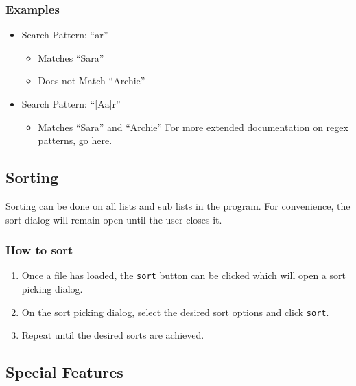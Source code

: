 \documentclass[english,floatsintext,man]{apa6}
\providecommand{\tightlist}{%
  \setlength{\itemsep}{0pt}\setlength{\parskip}{0pt}}
\begin{document}
\subsubsection{Examples}\label{examples}

\begin{itemize}
\tightlist
\item
  Search Pattern: \enquote{ar}

  \begin{itemize}
  \tightlist
  \item
    Matches \enquote{Sara}
  \item
    Does not Match \enquote{Archie}
  \end{itemize}
\item
  Search Pattern: \enquote{{[}A\textbar{}a{]}r}

  \begin{itemize}
  \tightlist
  \item
    Matches \enquote{Sara} and \enquote{Archie} For more extended
    documentation on regex patterns,
    \href{http://docs.oracle.com/javase/8/docs/api/java/util/regex/Pattern.html}{go
    here}.
  \end{itemize}
\end{itemize}

\subsection{Sorting}\label{sorting}

Sorting can be done on all lists and sub lists in the program. For
convenience, the sort dialog will remain open until the user closes it.

\subsubsection{How to sort}\label{how-to-sort}

\begin{enumerate}
\def\labelenumi{\arabic{enumi}.}
\tightlist
\item
  Once a file has loaded, the \texttt{sort} button can be clicked which
  will open a sort picking dialog.
\item
  On the sort picking dialog, select the desired sort options and click
  \texttt{sort}.
\item
  Repeat until the desired sorts are achieved.
\end{enumerate}

\subsection{Special Features}\label{special-features}
\end{document}
